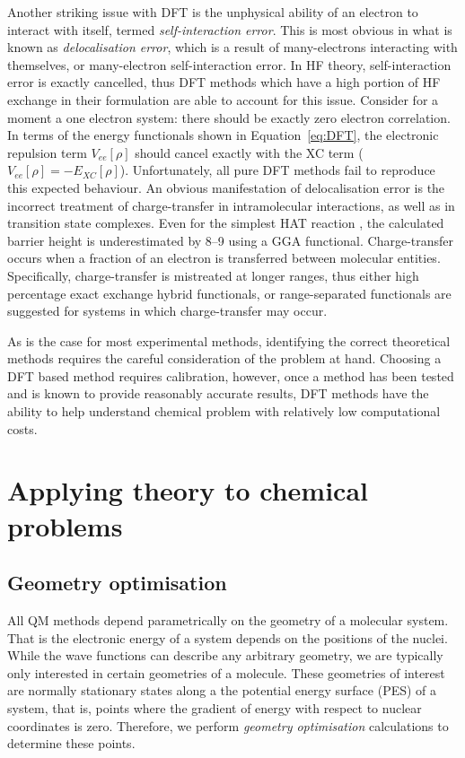 Another striking issue with DFT is the unphysical ability of an electron to interact with itself, termed \emph{self-interaction error}. This is most obvious in what is known as \emph{delocalisation error}, which is a result of many-electrons interacting with themselves, or many-electron self-interaction error. In HF theory, self-interaction error is exactly cancelled, thus DFT methods which have a high portion of HF exchange in their formulation are able to account for this issue. Consider for a moment a one electron system: there should be exactly zero electron correlation. In terms of the energy functionals shown in Equation~\ref{eq:DFT}, the electronic repulsion term $V_{ee}[\rho]$ should cancel exactly with the XC term ($V_{ee}[\rho] = -E_{XC}[\rho]$).\cite{Cramer2004} Unfortunately, all pure DFT methods fail to reproduce this expected behaviour. An obvious manifestation of delocalisation error is the incorrect treatment of charge-transfer in intramolecular interactions,\cite{MoriSanchez2008,OterodelaRoza2014} as well as in transition state complexes. Even for the simplest HAT reaction , the calculated barrier height is underestimated by 8--9 \kcalmol using a GGA functional.\cite{Csonka1998} Charge-transfer occurs when a fraction of an electron is transferred between molecular entities. Specifically, charge-transfer is mistreated at longer ranges, thus either high percentage exact exchange hybrid functionals, or range-separated functionals are suggested for systems in which charge-transfer may occur.

As is the case for most experimental methods, identifying the correct theoretical methods requires the careful consideration of the problem at hand. Choosing a DFT based method requires calibration, however, once a method has been tested and is known to provide reasonably accurate results, DFT methods have the ability to help understand chemical problem with relatively low computational costs.

\section{Applying theory to chemical problems}

\subsection{Geometry optimisation}

All QM methods depend parametrically on the geometry of a molecular system. That is the electronic energy of a system depends on the positions of the nuclei. While the wave functions can describe any arbitrary geometry, we are typically only interested in certain geometries of a molecule. These geometries of interest are normally stationary states along a the potential energy surface (PES) of a system, that is, points where the gradient of energy with respect to nuclear coordinates is zero. Therefore, we perform \emph{geometry optimisation} calculations to determine these points.

